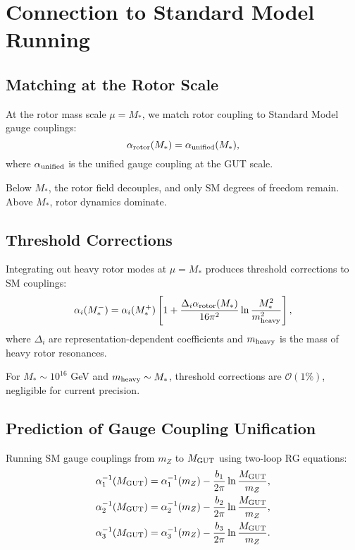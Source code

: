 \documentclass[11pt,a4paper]{article}
\numberwithin{equation}{section}
\theoremstyle{plain}
\theoremstyle{definition}
\theoremstyle{remark}
\begin{document}
\vspace{1em}

\section{Connection to Standard Model Running}\label{sec:SM}

\subsection{Matching at the Rotor Scale}

At the rotor mass scale $\mu=M_*$, we match rotor coupling to Standard Model gauge couplings:
\begin{equation}
\alpha_{\rm rotor}(M_*) = \alpha_{\rm unified}(M_*),
\label{eq:matching}
\end{equation}
where $\alpha_{\rm unified}$ is the unified gauge coupling at the GUT scale.

Below $M_*$, the rotor field decouples, and only SM degrees of freedom remain. Above $M_*$, rotor dynamics dominate.

\subsection{Threshold Corrections}

Integrating out heavy rotor modes at $\mu=M_*$ produces threshold corrections to SM couplings:
\begin{equation}
\alpha_i(M_*^-) = \alpha_i(M_*^+)\left[1 + \frac{\Delta_i\alpha_{\rm rotor}(M_*)}{16\pi^2}\ln\frac{M_*^2}{m_{\rm heavy}^2}\right],
\label{eq:threshold}
\end{equation}
where $\Delta_i$ are representation-dependent coefficients and $m_{\rm heavy}$ is the mass of heavy rotor resonances.

For $M_* \sim 10^{16}$ GeV and $m_{\rm heavy}\sim M_*$, threshold corrections are $\mathcal{O}(1\%)$, negligible for current precision.

\subsection{Prediction of Gauge Coupling Unification}

Running SM gauge couplings from $m_Z$ to $M_{\rm GUT}$ using two-loop RG equations:
\begin{align}
\alpha_1^{-1}(M_{\rm GUT}) &= \alpha_1^{-1}(m_Z) - \frac{b_1}{2\pi}\ln\frac{M_{\rm GUT}}{m_Z}, \notag\\
\alpha_2^{-1}(M_{\rm GUT}) &= \alpha_2^{-1}(m_Z) - \frac{b_2}{2\pi}\ln\frac{M_{\rm GUT}}{m_Z}, \notag\\
\alpha_3^{-1}(M_{\rm GUT}) &= \alpha_3^{-1}(m_Z) - \frac{b_3}{2\pi}\ln\frac{M_{\rm GUT}}{m_Z}.
\label{eq:RG-SM-running}
\end{align}
\end{document}

